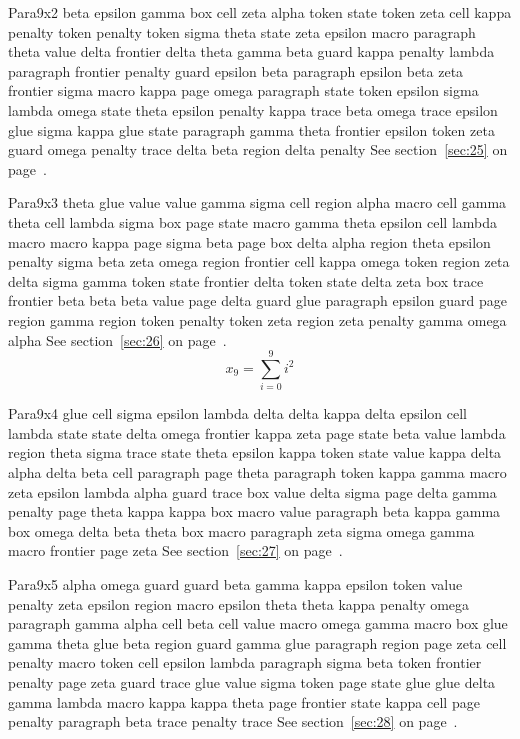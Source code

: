 \documentclass{article}
\begin{document}
Para9x2 beta epsilon gamma box cell zeta alpha token state token zeta cell kappa penalty token penalty token sigma theta state zeta epsilon macro paragraph theta value delta frontier delta theta gamma beta guard kappa penalty lambda paragraph frontier penalty guard epsilon beta paragraph epsilon beta zeta frontier sigma macro kappa page omega paragraph state token epsilon sigma lambda omega state theta epsilon penalty kappa trace beta omega trace epsilon glue sigma kappa glue state paragraph gamma theta frontier epsilon token zeta guard omega penalty trace delta beta region delta penalty See section~\ref{sec:25} on page~\pageref{sec:29}.

Para9x3 theta glue value value gamma sigma cell region alpha macro cell gamma theta cell lambda sigma box page state macro gamma theta epsilon cell lambda macro macro kappa page sigma beta page box delta alpha region theta epsilon penalty sigma beta zeta omega region frontier cell kappa omega token region zeta delta sigma gamma token state frontier delta token state delta zeta box trace frontier beta beta beta value page delta guard glue paragraph epsilon guard page region gamma region token penalty token zeta region zeta penalty gamma omega alpha See section~\ref{sec:26} on page~\pageref{sec:30}.
\begin{equation} x_{9} = \sum_{i=0}^{9} i^2 \label{eq:9}\end{equation}

Para9x4 glue cell sigma epsilon lambda delta delta kappa delta epsilon cell lambda state state delta omega frontier kappa zeta page state beta value lambda region theta sigma trace state theta epsilon kappa token state value kappa delta alpha delta beta cell paragraph page theta paragraph token kappa gamma macro zeta epsilon lambda alpha guard trace box value delta sigma page delta gamma penalty page theta kappa kappa box macro value paragraph beta kappa gamma box omega delta beta theta box macro paragraph zeta sigma omega gamma macro frontier page zeta See section~\ref{sec:27} on page~\pageref{sec:31}.

Para9x5 alpha omega guard guard beta gamma kappa epsilon token value penalty zeta epsilon region macro epsilon theta theta kappa penalty omega paragraph gamma alpha cell beta cell value macro omega gamma macro box glue gamma theta glue beta region guard gamma glue paragraph region page zeta cell penalty macro token cell epsilon lambda paragraph sigma beta token frontier penalty page zeta guard trace glue value sigma token page state glue glue delta gamma lambda macro kappa kappa theta page frontier state kappa cell page penalty paragraph beta trace penalty trace See section~\ref{sec:28} on page~\pageref{sec:32}.
\end{document}
